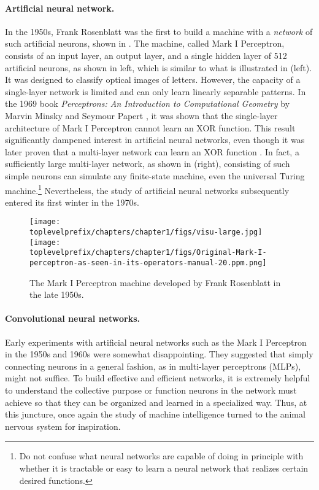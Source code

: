 \documentclass[../../book-main.tex]{subfiles}
\begin{document}
\paragraph{Artificial neural network.}
In the 1950s, Frank Rosenblatt was the first to build a machine with a \textit{network} of such artificial neurons, shown in . The machine, called Mark I Perceptron, consists of an input layer, an output layer, and a single hidden layer of 512 artificial neurons, as shown in  left, which is similar to what is illustrated in  (left). It was designed to classify optical images of letters. However, the capacity of a single-layer network is limited and can only learn linearly separable patterns. In the 1969 book \textit{Perceptrons: An Introduction to Computational Geometry} by Marvin Minsky and Seymour Papert \cite{Minsky-1969}, it was shown that the single-layer architecture of Mark I Perceptron cannot learn an XOR function. This result significantly dampened interest in artificial neural networks, even though it was later proven that a multi-layer network can learn an XOR function \cite{Rumelhart1986}. In fact, a sufficiently large multi-layer network, as shown in  (right), consisting of such simple neurons can simulate any finite-state machine, even the universal Turing machine.\footnote{Do not confuse what neural networks are capable of doing in principle with whether it is tractable or easy to learn a neural network that realizes certain desired functions.} Nevertheless, the study of artificial neural networks subsequently entered its first winter in the 1970s.

\begin{figure}
    \centering
    \texttt{[image: \\toplevelprefix/chapters/chapter1/figs/visu-large.jpg]}
    \hspace{2mm} \texttt{[image: \\toplevelprefix/chapters/chapter1/figs/Original-Mark-I-perceptron-as-seen-in-its-operators-manual-20.ppm.png]}
    \caption{The Mark I Perceptron machine developed by Frank Rosenblatt in the late 1950s.}
    \label{fig:perceptron}
\end{figure}


\paragraph{Convolutional neural networks.}
Early experiments with artificial neural networks such as the Mark I Perceptron in the 1950s and 1960s were somewhat disappointing. They suggested that simply connecting neurons in a general fashion, as in multi-layer perceptrons (MLPs), might not suffice. To build effective and efficient networks, it is extremely helpful to understand the collective purpose or function neurons in the network must achieve so that they can be organized and learned in a specialized way. Thus, at this juncture, once again the study of machine intelligence turned to the animal nervous system for inspiration.
\end{document}

